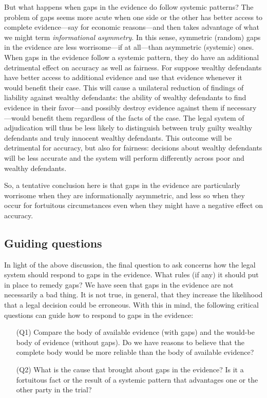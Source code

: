 \documentclass[
  10pt,
  dvipsnames,enabledeprecatedfontcommands]{scrartcl}
\begin{document}
But what happens when gaps in the evidence do follow systemic patterns?
The problem of gaps seems more acute when one side or the other has
better access to complete evidence---say for economic reasons---and then
takes advantage of what we might term \textit{informational asymmetry}.
In this sense, symmetric (random) gaps in the evidence are less
worrisome---if at all---than asymmetric (systemic) ones. When gaps in
the evidence follow a systemic pattern, they do have an additional
detrimental effect on accuracy as well as fairness. For suppose wealthy
defendants have better access to additional evidence and use that
evidence whenever it would benefit their case. This will cause a
unilateral reduction of findings of liability against wealthy
defendants: the ability of wealthy defendants to find evidence in their
favor---and possibly destroy evidence against them if necessary---would
benefit them regardless of the facts of the case. The legal system of
adjudication will thus be less likely to distinguish between truly
guilty wealthy defendants and truly innocent wealthy defendants. This
outcome will be detrimental for accuracy, but also for fairness:
decisions about wealthy defendants will be less accurate and the system
will perform differently across poor and wealthy defendants.

So, a tentative conclusion here is that gaps in the evidence are
particularly worrisome when they are informationally asymmetric, and
less so when they occur for fortuitous circumstances even when they
might have a negative effect on accuracy.

\hypertarget{guiding-questions}{%
\subsection{Guiding questions}\label{guiding-questions}}

In light of the above discussion, the final question to ask concerns how
the legal system should respond to gaps in the evidence. What rules (if
any) it should put in place to remedy gaps? We have seen that gaps in
the evidence are not necessarily a bad thing. It is not true, in
general, that they increase the likelihood that a legal decision could
be erroneous. With this in mind, the following critical questions can
guide how to respond to gaps in the evidence:

\begin{itemize}

\item[(Q1)] Compare the body of available evidence (with gaps) and the would-be body of evidence (without gaps). Do we have reasons to believe that the complete body would be more reliable than the body of available evidence? 

\item[(Q2)] What is the cause that brought about gaps in the evidence? Is it a fortuitous fact or the result of a systemic pattern that advantages one or the other party in the trial? 

\end{itemize}
\end{document}
